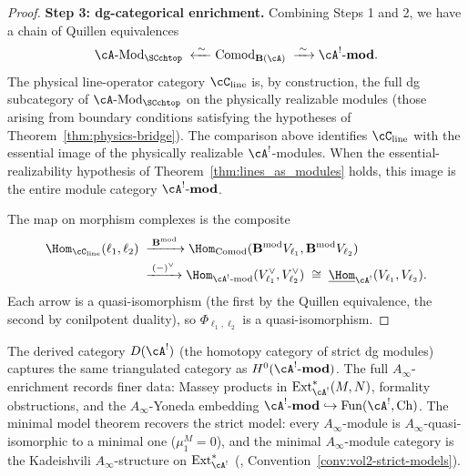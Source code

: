 \begin{proof}
\textbf{Step 3: dg-categorical enrichment.}
Combining Steps 1 and 2, we have a chain of Quillen
equivalences
\[
\cA\text{-}\mathrm{Mod}_{\SCchtop}
\;\xleftarrow{\;\sim\;}
\mathrm{Comod}_{\mathbf{B}(\cA)}
\;\xrightarrow{\;\sim\;}
\cA^!\text{-}\mathbf{mod}.
\]
The physical line-operator category $\cC_{\mathrm{line}}$
is, by construction, the full dg subcategory of
$\cA\text{-}\mathrm{Mod}_{\SCchtop}$ on the physically
realizable modules (those arising from boundary conditions
satisfying the hypotheses of Theorem~\ref{thm:physics-bridge}). The
comparison above identifies $\cC_{\mathrm{line}}$ with the essential
image of the physically realizable $\cA^!$-modules. When the
essential-realizability hypothesis of
Theorem~\ref{thm:lines_as_modules} holds, this image is the entire
module category $\cA^!\text{-}\mathbf{mod}$.

The map on morphism complexes is the composite
\begin{align*}
\Hom_{\cC_{\mathrm{line}}}(\ell_1,\ell_2)
&\;\xrightarrow{\;\mathbf{B}^{\mathrm{mod}}\;}
\Hom_{\mathrm{Comod}}(\mathbf{B}^{\mathrm{mod}}V_{\ell_1},
\mathbf{B}^{\mathrm{mod}}V_{\ell_2}) \\
&\;\xrightarrow{\;(-)^\vee\;}
\Hom_{\cA^!\text{-mod}}(V_{\ell_1}^\vee,V_{\ell_2}^\vee)
\;\cong\;
\underline{\Hom}_{\cA^!}(V_{\ell_1},V_{\ell_2}).
\end{align*}
Each arrow is a quasi-isomorphism (the first by the
Quillen equivalence, the second by conilpotent duality),
so $\Phi_{\ell_1,\ell_2}$ is a quasi-isomorphism.
\end{proof}

\begin{remark}
The derived category $D(\cA^!)$ (the homotopy category
of strict dg modules) captures the same triangulated
category as $H^0(\cA^!\text{-}\mathbf{mod})$. The
full $A_\infty$-enrichment records finer data:
Massey products in $\operatorname{Ext}^*_{\cA^!}(M,N)$,
formality obstructions, and
the $A_\infty$-Yoneda embedding
$\cA^!\text{-}\mathbf{mod}\hookrightarrow
\mathrm{Fun}(\cA^!,\mathrm{Ch})$. The minimal model theorem
recovers the strict model: every
$A_\infty$-module is $A_\infty$-quasi-isomorphic to a
minimal one ($\mu_1^M=0$), and the minimal
$A_\infty$-module category is the Kadeishvili
$A_\infty$-structure on $\operatorname{Ext}^*_{\cA^!}$
(\cite{Kad82}, Convention~\ref{conv:vol2-strict-models}).
\end{remark}

